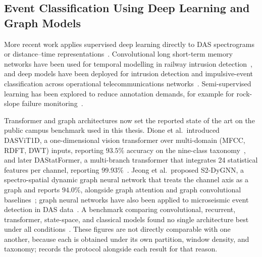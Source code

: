 \subsection{Event Classification Using Deep Learning and Graph Models}
\label{sec:chap2DASdeepLearning}
More recent work applies supervised deep learning directly to DAS spectrograms or distance--time representations~\cite{tomasov2023enhancing,tomasov2025perimeter}. Convolutional long short-term memory networks have been used for temporal modelling in railway intrusion detection~\cite{li2020convlstm}, and deep models have been deployed for intrusion detection and impulsive-event classification across operational telecommunications networks~\cite{han2024intrusion}. Semi-supervised learning has been explored to reduce annotation demands, for example for rock-slope failure monitoring~\cite{kang2024semisupervised}.

Transformer and graph architectures now set the reported state of the art on the public campus benchmark used in this thesis. Dione et al.\ introduced DASViT1D, a one-dimensional vision transformer over multi-domain (MFCC, RDFT, DWT) inputs, reporting $93.5\%$ accuracy on the nine-class taxonomy~\cite{dione2025intrusion}, and later DAStatFormer, a multi-branch transformer that integrates 24 statistical features per channel, reporting $99.93\%$~\cite{dione2026dastatformer}. Jeong et al.\ proposed S2-DyGNN, a spectro-spatial dynamic graph neural network that treats the channel axis as a graph and reports $94.0\%$, alongside graph attention and graph convolutional baselines~\cite{jeong2026s2dygnn}; graph neural networks have also been applied to microseismic event detection in DAS data~\cite{shahabudin2024gnn}. A benchmark comparing convolutional, recurrent, transformer, state-space, and classical models found no single architecture best under all conditions~\cite{shi2025benchmarking}. These figures are not directly comparable with one another, because each is obtained under its own partition, window density, and taxonomy;  records the protocol alongside each result for that reason.

